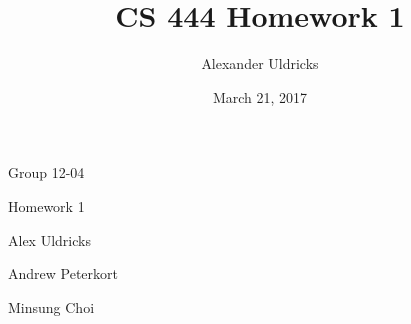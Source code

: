 \documentclass[draftclsnofoot,onecolumn,10pt]{article}
\title{CS 444 Homework 1}
\author{Alexander Uldricks}
\date{March 21, 2017}
\begin{document}
    \renewcommand\thesection{\arabic{section}}
    \renewcommand\thesubsection{\arabic{section}.\arabic{subsection}}
    \renewcommand\thesubsubsection{\arabic{section}.\arabic{subsection}.\arabic{subsubsection}}
    \begin{flushleft}
    Group 12-04
    \end{flushleft}
    \begin{flushleft}
    Homework 1
    \end{flushleft}
    \begin{flushleft}
    Alex Uldricks
    \end{flushleft}
    \begin{flushleft}
    Andrew Peterkort
    \end{flushleft}    
    \begin{flushleft}
    Minsung Choi
    \end{flushleft}
\end{document}
